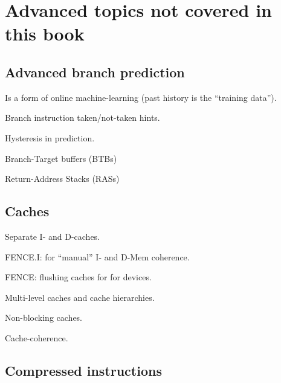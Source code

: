 

\chapter{Advanced topics not covered in this book}


\setcounter{page}{1}
\renewcommand{\thepage}{\arabic{chapter}-\arabic{page}}

\label{ch_Not_Covered}


\section{Advanced branch prediction}

Is a form of online machine-learning (past history is the ``training data'').

Branch instruction taken/not-taken hints.

Hysteresis in prediction.

Branch-Target buffers (BTBs)

Return-Address Stacks (RASs)


\section{Caches}

Separate I- and D-caches.

FENCE.I: for ``manual'' I- and D-Mem coherence.

FENCE: flushing caches for for devices.

Multi-level caches and cache hierarchies.

Non-blocking caches.

Cache-coherence.


\section{Compressed instructions}

